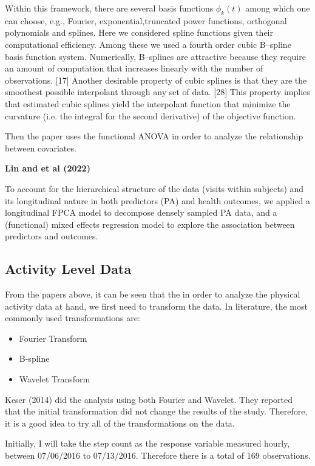\documentclass[12pt]{article}
\begin{document}
    Within this framework, there are several basis functions $\phi_k(t)$ among which one can choose,
    e.g., Fourier, exponential,truncated power functions, orthogonal polynomials and splines. Here we
    considered spline functions given their computational efficiency. Among these we used a fourth order
    cubic B–spline basis function system. Numerically, B–splines are attractive because they require
    an amount of computation that increases linearly with the number of observations. [17] Another
    desirable property of cubic splines is that they are the smoothest possible interpolant through
    any set of data. [28] This property implies that estimated cubic splines yield the interpolant
    function that minimize the curvature (i.e. the integral for the second derivative) of the objective function.

    Then the paper uses the functional ANOVA in order to analyze the relationship between covariates.

    \textbf{Lin and et al (2022)}

    To account for the hierarchical structure of the data (visits within subjects) and its
    longitudinal nature in both predictors (PA) and health outcomes, we applied a longitudinal
    FPCA model to decompose densely sampled PA data, and a (functional) mixed effects regression
    model to explore the association between predictors and outcomes.


    \subsection{Activity Level Data}

    From the papers above, it can be seen that the in order to analyze the physical activity data at hand,
    we first need to transform the data. In literature, the most commonly used transformations are:
    \begin{itemize}
        \item Fourier Transform
        \item B-spline
        \item Wavelet Transform
    \end{itemize}

    Keser (2014) did the analysis using both Fourier and Wavelet. They reported that the initial transformation
     did not change the results of the study. Therefore, it is a good idea to try all of the transformations on the data.

    Initially, I will take the step count as the response variable measured hourly, between 07/06/2016 to 07/13/2016.
    Therefore there is a total of 169 observations.
\end{document}
